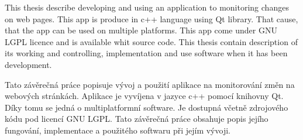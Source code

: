 


\def\obrazek#1#2#3{
	\begin{figure}[tbhp]
  \centering
	{#1}
	\caption{{#2}}
  \label{fig:#3}
\end{figure}
	}
\def\obr#1#2{\obrazek{\texttt{[image: screenshots/\#1.png]}}{#2}{#1}}
\def\obrsize#1#2#3{\obrazek{\texttt{[image: screenshots/\#1.png]}}{#2}{#1}}
\def\,{\penalty10000\hskip.25em}
\pagestyle{headings}

\bakalarska





{This thesis describe developing and using an application to monitoring changes on web pages.
This app is produce in c++ language using Qt library. That cause, that the app can be used on multiple platforms.
This app come under GNU LGPL licence and is available whit source code. This thesis contain description of its working and controlling, implementation and use software when it has been development.}

{Tato závěrečná práce popisuje vývoj a použití aplikace na monitorování změn na webových stránkách.
Aplikace je vyvíjena v jazyce c++ pomocí knihovny Qt. Díky tomu se jedná o multiplatformní software.
Je dostupná včetně zdrojového kódu pod licencí GNU LGPL. Tato závěrečná práce obsahuje popis jejího fungování, implementace a použitého softwaru při jejím vývoji.}

\obsah















